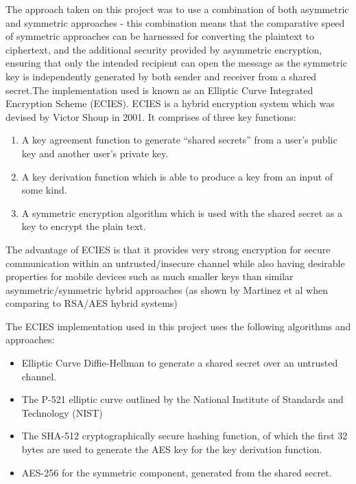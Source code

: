 \documentclass{mproj}
\begin{document}
The approach taken on this project was to use a combination of both asymmetric and symmetric approaches - this combination means that the comparative speed of symmetric approaches can be harnessed for converting the plaintext to ciphertext, and the additional security provided by asymmetric encryption, ensuring that only the intended recipient can open the message as the symmetric key is independently generated by both sender and receiver from a shared secret.The implementation used is known as an Elliptic Curve Integrated Encryption Scheme (ECIES)\cite{martinez2010comparison}. ECIES is a hybrid encryption system which was devised by Victor Shoup in 2001. It comprises of three key functions:
\begin{enumerate}
	\item A key agreement function to generate ``shared secrets'' from a user's public key and another user's private key.
	\item A key derivation function which is able to produce a key from an input of some kind.
	\item A symmetric encryption algorithm which is used with the shared secret as a key to encrypt the plain text.
\end{enumerate}
The advantage of ECIES is that it provides very strong encryption for secure communication within an untrusted/insecure channel while also having desirable properties for mobile devices such as much smaller keys than similar asymmetric/symmetric hybrid approaches (as shown by Martinez et al when comparing to RSA/AES hybrid systems\cite{martinezECIES})

The ECIES implementation used in this project uses the following algorithms and approaches:
\begin{itemize}
	\item Elliptic Curve Diffie-Hellman\cite{maurer2000diffie} to generate a shared secret over an untrusted channel. 
	\item The P-521 elliptic curve outlined by the National Institute of Standards and Technology (NIST)\cite{brown2001software}
	\item The SHA-512 cryptographically secure hashing function, of which the first 32 bytes are used to generate the AES key for the key derivation function.
	\item AES-256 for the symmetric component, generated from the shared secret.
\end{itemize}
\end{document}
